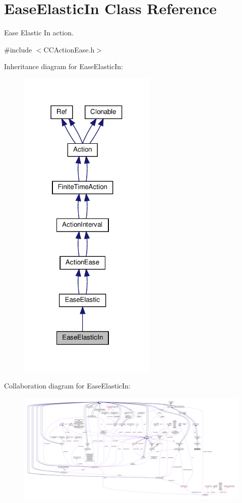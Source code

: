 \hypertarget{classEaseElasticIn}{}\section{Ease\+Elastic\+In Class Reference}
\label{classEaseElasticIn}


Ease Elastic In action.  




{\ttfamily \#include $<$C\+C\+Action\+Ease.\+h$>$}



Inheritance diagram for Ease\+Elastic\+In\+:
\nopagebreak
\begin{figure}[H]
\begin{center}
\leavevmode
\includegraphics[width=186pt]{classEaseElasticIn__inherit__graph}
\end{center}
\end{figure}


Collaboration diagram for Ease\+Elastic\+In\+:
\nopagebreak
\begin{figure}[H]
\begin{center}
\leavevmode
\includegraphics[width=350pt]{classEaseElasticIn__coll__graph}
\end{center}
\end{figure}
